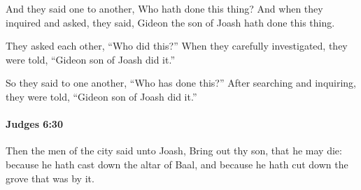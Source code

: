 			\begin{versebox}
					\item[BHS] 
					\item[ASV] And they said one to another, Who hath done this thing? And when they inquired and asked, they said, Gideon the son of Joash hath done this thing.
					\item[NIV] They asked each other, “Who did this?” When they carefully investigated, they were told, “Gideon son of Joash did it.”
					\item[NRSV] So they said to one another, “Who has done this?” After searching and inquiring, they were told, “Gideon son of Joash did it.”
			\end{versebox}

		\paragraph{Judges 6:30} %
			\label{JUDGES-6-30}

			Then the men of the city said unto Joash, Bring out thy son, that he may die: because he hath cast down the altar of Baal, and because he hath cut down the grove that was by it.

